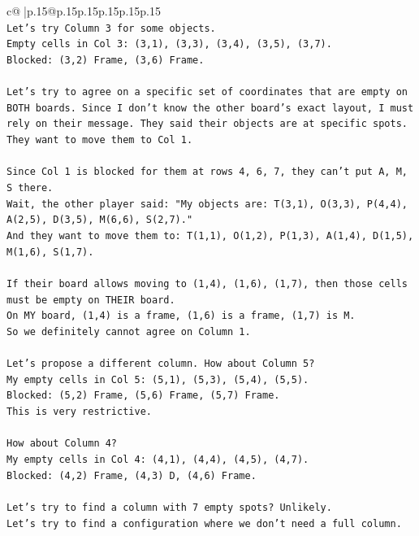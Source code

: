\documentclass{article}
\begin{document}
{\begin{supertabular}{c@{$\;$}|p{.15\linewidth}@{}p{.15\linewidth}p{.15\linewidth}p{.15\linewidth}p{.15\linewidth}p{.15\linewidth}}
{{{\\ 
\texttt{Let's try Column 3 for some objects.} \\
\texttt{Empty cells in Col 3: (3,1), (3,3), (3,4), (3,5), (3,7).} \\
\texttt{Blocked: (3,2) Frame, (3,6) Frame.} \\
\\ 
\texttt{Let's try to agree on a specific set of coordinates that are empty on BOTH boards. Since I don't know the other board's exact layout, I must rely on their message. They said their objects are at specific spots. They want to move them to Col 1.} \\
\\ 
\texttt{Since Col 1 is blocked for them at rows 4, 6, 7, they can't put A, M, S there.} \\
\texttt{Wait, the other player said: "My objects are: T(3,1), O(3,3), P(4,4), A(2,5), D(3,5), M(6,6), S(2,7)."} \\
\texttt{And they want to move them to: T(1,1), O(1,2), P(1,3), A(1,4), D(1,5), M(1,6), S(1,7).} \\
\\ 
\texttt{If their board allows moving to (1,4), (1,6), (1,7), then those cells must be empty on THEIR board.} \\
\texttt{On MY board, (1,4) is a frame, (1,6) is a frame, (1,7) is M.} \\
\texttt{So we definitely cannot agree on Column 1.} \\
\\ 
\texttt{Let's propose a different column. How about Column 5?} \\
\texttt{My empty cells in Col 5: (5,1), (5,3), (5,4), (5,5).} \\
\texttt{Blocked: (5,2) Frame, (5,6) Frame, (5,7) Frame.} \\
\texttt{This is very restrictive.} \\
\\ 
\texttt{How about Column 4?} \\
\texttt{My empty cells in Col 4: (4,1), (4,4), (4,5), (4,7).} \\
\texttt{Blocked: (4,2) Frame, (4,3) D, (4,6) Frame.} \\
\\ 
\texttt{Let's try to find a column with 7 empty spots? Unlikely.} \\
\texttt{Let's try to find a configuration where we don't need a full column.} \\
\\ 
}}}
\end{supertabular}}
\end{document}
